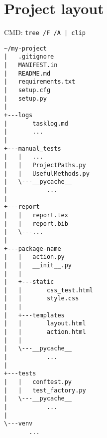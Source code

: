 \section{Project layout}\label{dev-layout}

CMD: \lstinline{tree /F /A | clip} 

\begin{lstlisting}[]
~/my-project
|   .gitignore
|   MANIFEST.in
|   README.md
|   requirements.txt
|   setup.cfg
|   setup.py
|   
+---logs
|       tasklog.md
|       ...
|   
+---manual_tests
|   |   ...
|   |   ProjectPaths.py
|   |   UsefulMethods.py
|   \---__pycache__
|           ...
|   
+---report
|   |   report.tex
|   |   report.bib
|   \---...
|       
+---package-name
|   |   action.py
|   |   __init__.py
|   |   
|   +---static
|   |       css_test.html
|   |       style.css
|   |       
|   +---templates
|   |       layout.html
|   |       action.html
|   |       
|   \---__pycache__
|           ...
|       
+---tests
|   |   conftest.py
|   |   test_factory.py
|   \---__pycache__
|           ...
|           
\---venv
       ...
\end{lstlisting}